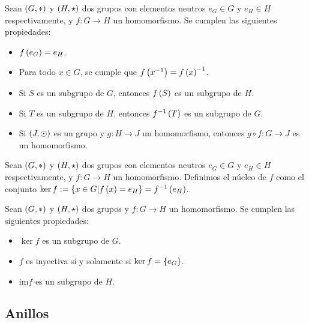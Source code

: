 \begin{proposition}
  \rm Sean $\left(G,\ast\right)$ y $\left(H,\star\right)$ dos grupos con elementos neutros $e_G\in G$ y $e_H\in H$ respectivamente, y $f:G\rightarrow H$ un homomorfismo. Se cumplen las siguientes propiedades:
  \begin{itemize}
    \item[1.] $f\left(e_G\right)=e_H$.
    \item[2.] Para todo $x\in G$, se cumple que $f\left(x^{-1}\right)=f\left(x\right)^{-1}$.
    \item[3.] Si $S$ es un subgrupo de $G$, entonces $f\left(S\right)$ es un subgrupo de $H$.
    \item[4.] Si $T$ es un subgrupo de $H$, entonces $f^{-1}\left(T\right)$ es un subgrupo de $G$.
    \item[5.] Si $\left(J, \odot\right)$ es un grupo y $g:H\rightarrow J$ un homomorfismo, entonces $g\circ f:G\rightarrow J$ es un homomorfismo. 
  \end{itemize}
\end{proposition}

\begin{definition}
  \rm Sean $\left(G,\ast\right)$ y $\left(H,\star\right)$ dos grupos con elementos neutros $e_G\in G$ y $e_H\in H$ respectivamente, y $f:G\rightarrow H$ un homomorfismo. Definimos el núcleo de $f$ como el conjunto $\ker f:=\left\{x\in G\middle|f\left(x\right)=e_H\right\}=f^{-1}\left(e_H\right)$.
\end{definition}

\begin{proposition}
  \rm Sean $\left(G,\ast\right)$ y $\left(H,\star\right)$ dos grupos y $f:G\rightarrow H$ un homomorfismo. Se cumplen las siguientes propiedades:
  \begin{itemize}
    \item[1.] $\ker f$ es un subgrupo de $G$.
    \item[2.] $f$ es inyectiva si y solamente si $\ker f=\left\{e_G\right\}$.
    \item[3.] $\text{im} f$ es un subgrupo de $H$.
  \end{itemize}
\end{proposition}
\subsection{Anillos}

